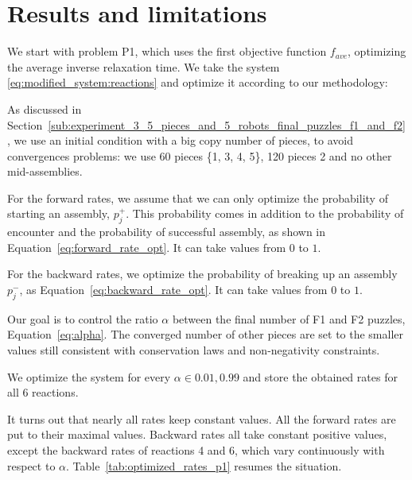 \section{Results and limitations} %
\label{sec:results_and_limitations}

    We start with problem P1, which uses the first objective function $f_{ave}$, optimizing the average inverse relaxation time. We take the system \eqref{eq:modified_system:reactions} and optimize it according to our methodology:

    \begin{my_itemize}
        \item As discussed in Section~\ref{sub:experiment_3_5_pieces_and_5_robots_final_puzzles_f1_and_f2}, we use an initial condition with a big copy number of pieces, to avoid convergences problems: we use 60 pieces \{1, 3, 4, 5\}, 120 pieces 2 and no other mid-assemblies.
        \item For the forward rates, we assume that we can only optimize the probability of starting an assembly, $p_j^+$. This probability comes in addition to the probability of encounter and the probability of successful assembly, as shown in Equation~\eqref{eq:forward_rate_opt}. It can take values from $0$ to $1$.
        \item For the backward rates, we optimize the probability of breaking up an assembly $p_j^-$, as Equation~\eqref{eq:backward_rate_opt}. It can take values from $0$ to $1$.
        \item Our goal is to control the ratio $\alpha$ between the final number of F1 and F2 puzzles, Equation~\eqref{eq:alpha}. The converged number of other pieces are set to the smaller values still consistent with conservation laws and non-negativity constraints.
    \end{my_itemize}

    We optimize the system for every $\alpha \in {0.01, 0.99}$ and store the obtained rates for all 6 reactions.

    It turns out that nearly all rates keep constant values. All the forward rates are put to their maximal values. Backward rates all take constant positive values, except the backward rates of reactions 4 and 6, which vary continuously with respect to $\alpha$. Table~\ref{tab:optimized_rates_p1} resumes the situation.


